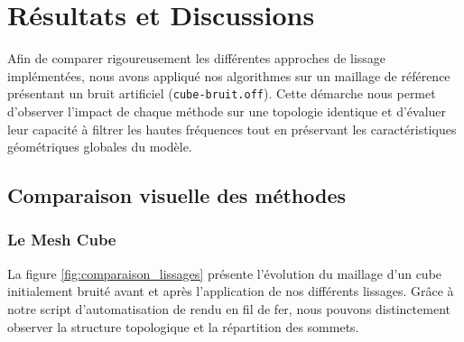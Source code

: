 \documentclass[11pt,a4paper]{article}
\begin{document}
\newpage

\section{Résultats et Discussions}

Afin de comparer rigoureusement les différentes approches de lissage implémentées, nous avons appliqué nos algorithmes sur un maillage de référence présentant un bruit artificiel (\texttt{cube-bruit.off}). Cette démarche nous permet d'observer l'impact de chaque méthode sur une topologie identique et d'évaluer leur capacité à filtrer les hautes fréquences tout en préservant les caractéristiques géométriques globales du modèle.

\subsection{Comparaison visuelle des méthodes}

\subsubsection{Le Mesh Cube}


La figure \ref{fig:comparaison_lissages} présente l'évolution du maillage d'un cube initialement bruité avant et après l'application de nos différents lissages. 
Grâce à notre script d'automatisation de rendu en fil de fer, nous pouvons distinctement observer la structure topologique et la répartition des sommets.
\end{document}
